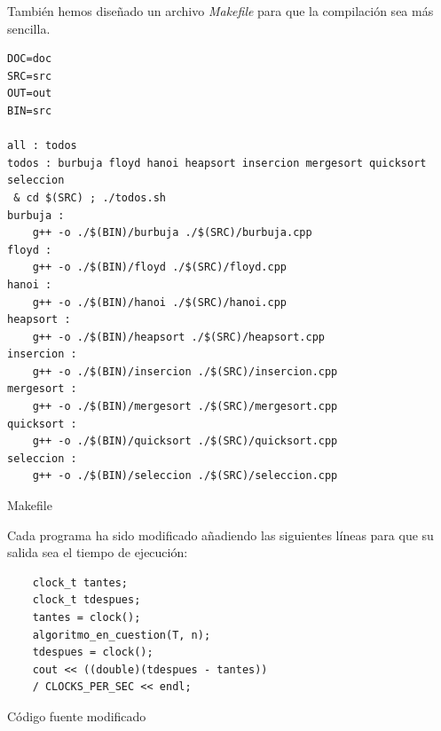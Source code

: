\documentclass[12pt,spanish]{article}
\begin{document}
También hemos diseñado un archivo \textit{Makefile} para que la compilación sea más sencilla.
\begin{listing}[H]
\begin{verbatim}
DOC=doc
SRC=src
OUT=out
BIN=src

all : todos
todos : burbuja floyd hanoi heapsort insercion mergesort quicksort seleccion
 & cd $(SRC) ; ./todos.sh
burbuja : 
    g++ -o ./$(BIN)/burbuja ./$(SRC)/burbuja.cpp
floyd : 
    g++ -o ./$(BIN)/floyd ./$(SRC)/floyd.cpp
hanoi : 
    g++ -o ./$(BIN)/hanoi ./$(SRC)/hanoi.cpp
heapsort : 
    g++ -o ./$(BIN)/heapsort ./$(SRC)/heapsort.cpp
insercion : 
    g++ -o ./$(BIN)/insercion ./$(SRC)/insercion.cpp
mergesort : 
    g++ -o ./$(BIN)/mergesort ./$(SRC)/mergesort.cpp
quicksort : 
    g++ -o ./$(BIN)/quicksort ./$(SRC)/quicksort.cpp
seleccion :
    g++ -o ./$(BIN)/seleccion ./$(SRC)/seleccion.cpp
\end{verbatim}
\caption{Makefile}
\end{listing}
\newpage
Cada programa ha sido modificado añadiendo las siguientes líneas para que su salida sea el tiempo de ejecución:

\begin{listing}[H]
\begin{verbatim}
    clock_t tantes;
    clock_t tdespues;
    tantes = clock();
    algoritmo_en_cuestion(T, n);
    tdespues = clock();
    cout << ((double)(tdespues - tantes))
    / CLOCKS_PER_SEC << endl;
\end{verbatim}
\caption{Código fuente modificado}
\end{listing}
\end{document}
